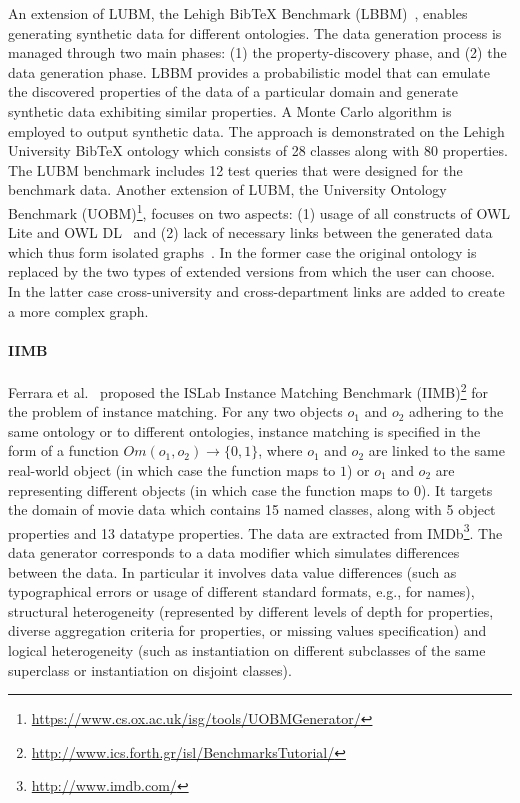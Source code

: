 An extension of LUBM, the Lehigh BibTeX Benchmark (LBBM)~\cite{Wang2005}, enables generating synthetic data for different ontologies. The data generation process is managed through two main phases: (1) the property-discovery phase, and (2) the data generation phase. LBBM provides a probabilistic model that can emulate the discovered properties of the data of a particular domain and generate synthetic data exhibiting similar properties. A Monte Carlo algorithm is employed to output synthetic data. The approach is demonstrated on the Lehigh University BibTeX ontology which consists of 28 classes along with 80 properties. The LUBM benchmark includes 12 test queries that were designed for the benchmark data. Another extension of LUBM, the University Ontology Benchmark (UOBM)\footnote{\url{https://www.cs.ox.ac.uk/isg/tools/UOBMGenerator/}}, focuses on two aspects: (1) usage of all constructs of OWL Lite and OWL DL~\cite{owl} and (2) lack of necessary links between the generated data which thus form isolated graphs~\cite{Ma:2006:TCO:2094613.2094629}. In the former case the original ontology is replaced by the two types of extended versions from which the user can choose. In the latter case cross-university and cross-department links are added to create a more complex graph.

\paragraph{IIMB} Ferrara et al.~\cite{Ferrara08OM} proposed the ISLab Instance Matching Benchmark (IIMB)\footnote{\url{http://www.ics.forth.gr/isl/BenchmarksTutorial/}} for the problem of instance matching. For any two objects $o_1$ and $o_2$ adhering to the same ontology or to different ontologies, instance matching is specified in the form of a function $Om(o_1, o_2) \rightarrow \{0, 1\}$,  where $o_1$ and $o_2$ are linked to the same real-world object (in which case the function maps to $1$) or $o_1$ and $o_2$ are representing different objects (in which case the function maps to $0$). It targets the domain of movie data which contains 15 named classes, along with 5 object properties and 13 datatype properties. The data are extracted from IMDb\footnote{\url{http://www.imdb.com/}}. The data generator corresponds to a data modifier which simulates differences between the data. In particular it involves data value differences (such as typographical errors or usage of different standard formats, e.g., for names), structural heterogeneity (represented by different levels of depth for properties, diverse aggregation criteria for properties, or missing values specification) and logical heterogeneity (such as instantiation on different subclasses of the same superclass or instantiation on disjoint classes).


